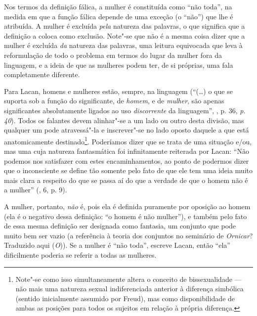 Nos termos da definição fálica, a mulher é constituída como ``não
toda'', na medida em que a função fálica depende de uma exceção (o
``não'') que lhe é atribuída. A mulher é excluída \emph{pela} natureza
das palavras, o que significa que a definição a coloca como exclusão.
Note"-se que não é a mesma coisa dizer que a mulher é excluída \emph{da}
natureza das palavras, uma leitura equivocada que leva à reformulação de
todo o problema em termos do lugar da mulher fora da linguagem, e a
ideia de que as mulheres podem ter, de si próprias, uma fala
completamente diferente.

Para Lacan, homens e mulheres estão, sempre, na linguagem (``(\ldots{}) o que
se suporta sob a função do significante, de \emph{homem}, e de
\emph{mulher}, são apenas significantes absolutamente ligados ao uso
\emph{discorrente} da linguagem'', , p. 36, \emph{p. 40}). Todos os
falantes devem alinhar"-se a um lado ou outro desta divisão, mas qualquer
um pode atravessá"-la e inscrever"-se no lado oposto daquele a que está
anatomicamente destinado\footnote{Note"-se como isso simultaneamente
  altera o conceito de bissexualidade --- não mais uma natureza sexual
  indiferenciada anterior à diferença simbólica (sentido inicialmente
  assumido por Freud), mas como disponibilidade de ambas as posições
  para todos os sujeitos em relação à própria diferença.}. Poderíamos
dizer que se trata de uma situação e/ou, mas uma cuja natureza
fantasmática foi infinitamente reiterada por Lacan: ``Não podemos nos
satisfazer com estes encaminhamentos, ao ponto de podermos dizer que o
inconsciente se define tão somente pelo fato de que ele tem uma ideia
muito mais clara a respeito do que se passa aí do que a verdade de que o
homem não é a mulher'' (, 6, p. 9).

A mulher, portanto, \emph{não} é, pois ela é definida puramente por
oposição ao homem (ela é o negativo dessa definição: ``o homem é não
mulher''), e também pelo fato de essa mesma definição ser designada como
fantasia, um conjunto que pode muito bem ser vazio (a referência à
teoria dos conjuntos no seminário de \emph{Ornicar}? Traduzido aqui
(\emph{O})). Se a mulher é ``não toda'', escreve Lacan, então ``ela''
dificilmente poderia se referir a todas as mulheres.

